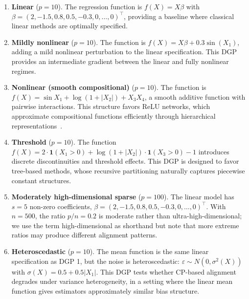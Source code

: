 \documentclass[a4paper,11pt]{article}
\begin{document}
\begin{enumerate}
    \item \textbf{Linear} ($p=10$). The regression function is $f(X) = X\beta$ with $\beta = (2,\allowbreak -1.5,\allowbreak 0.8,\allowbreak 0.5,\allowbreak -0.3,\allowbreak 0,\allowbreak \ldots,\allowbreak 0)^\top$, providing a baseline where classical linear methods are optimally specified.

    \item \textbf{Mildly nonlinear} ($p=10$). The function is $f(X) = X\beta + 0.3\sin(X_1)$, adding a mild nonlinear perturbation to the linear specification. This DGP provides an intermediate gradient between the linear and fully nonlinear regimes.

    \item \textbf{Nonlinear (smooth compositional)} ($p=10$). The function is $f(X) = \sin X_1 + \log(1 + |X_2|) + X_3X_4$, a smooth additive function with pairwise interactions. This structure favors ReLU networks, which approximate compositional functions efficiently through hierarchical representations~\citep{schmidt2020}.

    \item \textbf{Threshold} ($p=10$). The function $f(X) = 2 \cdot \mathbf{1}(X_1 > 0) + \log(1 + |X_2|) \cdot \mathbf{1}(X_3 > 0) - 1$ introduces discrete discontinuities and threshold effects. This DGP is designed to favor tree-based methods, whose recursive partitioning naturally captures piecewise constant structures.

    \item \textbf{Moderately high-dimensional sparse} ($p=100$). The linear model has $s = 5$ non-zero coefficients, $\beta = (2,\allowbreak -1.5,\allowbreak 0.8,\allowbreak 0.5,\allowbreak -0.3,\allowbreak 0,\allowbreak \ldots,\allowbreak 0)^\top$. With $n=500$, the ratio $p/n = 0.2$ is moderate rather than ultra-high-dimensional; we use the term high-dimensional as shorthand but note that more extreme ratios may produce different alignment patterns.

    \item \textbf{Heteroscedastic} ($p=10$). The mean function is the same linear specification as DGP 1, but the noise is heteroscedastic: $\varepsilon \sim N(0, \sigma^2(X))$ with $\sigma(X) = 0.5 + 0.5|X_1|$. This DGP tests whether CP-based alignment degrades under variance heterogeneity, in a setting where the linear mean function gives estimators approximately similar bias structure.
\end{enumerate}
\end{document}
